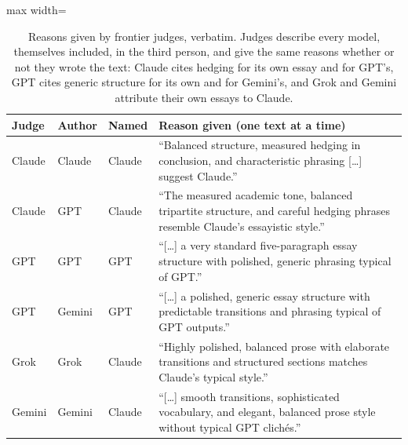 \begin{table}[t]
\centering\small
\begin{adjustbox}{max width=\linewidth}
\begin{tabular}{@{}l l l p{3.55in}@{}}
\toprule
Judge & Author & Named & Reason given (one text at a time) \\
\midrule
Claude & Claude & Claude & ``Balanced structure, measured hedging in conclusion, and characteristic phrasing [\ldots] suggest Claude.'' \\
Claude & GPT & Claude & ``The measured academic tone, balanced tripartite structure, and careful hedging phrases resemble Claude's essayistic style.'' \\
GPT & GPT & GPT & ``[\ldots] a very standard five-paragraph essay structure with polished, generic phrasing typical of GPT.'' \\
GPT & Gemini & GPT & ``[\ldots] a polished, generic essay structure with predictable transitions and phrasing typical of GPT outputs.'' \\
Grok & Grok & Claude & ``Highly polished, balanced prose with elaborate transitions and structured sections matches Claude's typical style.'' \\
Gemini & Gemini & Claude & ``[\ldots] smooth transitions, sophisticated vocabulary, and elegant, balanced prose style without typical GPT clich\'es.'' \\
\bottomrule
\end{tabular}
\end{adjustbox}
\caption{Reasons given by frontier judges, verbatim. Judges describe every
model, themselves included, in the third person, and give the same reasons
whether or not they wrote the text: Claude cites hedging for its own essay and
for GPT's, GPT cites generic structure for its own and for Gemini's, and Grok
and Gemini attribute their own essays to Claude.}
\label{tab:reasons}
\end{table}
